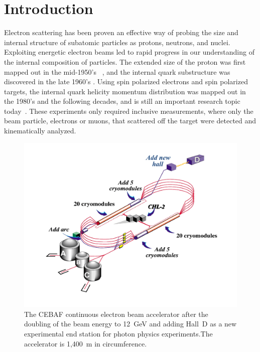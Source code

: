 \documentclass[final,3p,twocolumn]{elsarticle}
\begin{document}
\linenumbers
\section{Introduction}

Electron scattering has been proven an effective way of probing the size and internal structure of subatomic
particles as protons, neutrons, and nuclei. Exploiting energetic electron beams led to rapid progress in our
understanding of the internal composition of particles. The extended size of the proton was first mapped out in the
mid-1950's~\cite{Mcallister:1956ng} , and the internal quark substructure was discovered in the late 1960's
\cite{Breidenbach:1969kd}. Using spin polarized electrons and spin polarized targets, the internal quark helicity
momentum distribution was mapped out in the 1980's and the following decades, and is still an important research
topic today~\cite{Kuhn:2008sy}. These experiments only required inclusive measurements, where only the beam
particle, electrons or muons, that scattered off the target were detected and kinematically analyzed.  

\begin{figure}[ht]
\centerline{\includegraphics[width=1.8\columnwidth]{cebaf.pdf}}
\caption{The CEBAF continuous electron beam accelerator after the doubling of the beam energy to 12~GeV and 
adding Hall~D as a new experimental end station for photon physics experiments.The accelerator is 1,400~m in
circumference.}
\label{cebaf12}
\end{figure} 
\end{document}
